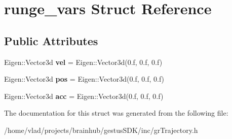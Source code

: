 \hypertarget{structrunge__vars}{}\section{runge\+\_\+vars Struct Reference}
\label{structrunge__vars}
\subsection*{Public Attributes}
\begin{DoxyCompactItemize}
\item 
\mbox{\label{structrunge__vars_a89b75da82b2a1c1237296fb7c33e8b93}} 
Eigen\+::\+Vector3d {\bfseries vel} = Eigen\+::\+Vector3d(0.f, 0.f, 0.f)
\item 
\mbox{\label{structrunge__vars_a0ab2daf75798374698b54eef912fed78}} 
Eigen\+::\+Vector3d {\bfseries pos} = Eigen\+::\+Vector3d(0.f, 0.f, 0.f)
\item 
\mbox{\label{structrunge__vars_ad4d7394fcb60cc68782af14aea77188a}} 
Eigen\+::\+Vector3d {\bfseries acc} = Eigen\+::\+Vector3d(0.f, 0.f, 0.f)
\end{DoxyCompactItemize}


The documentation for this struct was generated from the following file\+:\begin{DoxyCompactItemize}
\item 
/home/vlad/projects/brainhub/gestus\+S\+D\+K/inc/gr\+Trajectory.\+h\end{DoxyCompactItemize}
